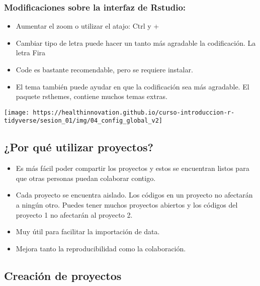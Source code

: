 \documentclass[
]{book}
\begin{document}
\hypertarget{modificaciones-sobre-la-interfaz-de-rstudio}{%
\subsubsection{\texorpdfstring{\textbf{Modificaciones sobre la interfaz de Rstudio:}}{Modificaciones sobre la interfaz de Rstudio:}}\label{modificaciones-sobre-la-interfaz-de-rstudio}}

\begin{itemize}
\item
  Aumentar el zoom o utilizar el atajo: Ctrl y +
\item
  Cambiar tipo de letra puede hacer un tanto más agradable la codificación. La letra Fira
\item
  Code es bastante recomendable, pero se requiere instalar.
\item
  El tema también puede ayudar en que la codificación sea más agradable. El paquete rsthemes, contiene muchos temas extras.
\end{itemize}

\begin{center}\texttt{[image: https://healthinnovation.github.io/curso-introduccion-r-tidyverse/sesion\_01/img/04\_config\_global\_v2]} \end{center}

\hypertarget{por-quuxe9-utilizar-proyectos}{%
\subsection{¿Por qué utilizar proyectos?}\label{por-quuxe9-utilizar-proyectos}}

\begin{itemize}
\item
  Es más fácil poder compartir los proyectos y estos se encuentran listos para que otras personas puedan colaborar contigo.
\item
  Cada proyecto se encuentra aislado. Los códigos en un proyecto no afectarán a ningún otro. Puedes tener muchos proyectos abiertos y los códigos del proyecto 1 no afectarán al proyecto 2.
\item
  Muy útil para facilitar la importación de data.
\item
  Mejora tanto la reproducibilidad como la colaboración.
\end{itemize}

\hypertarget{creaciuxf3n-de-proyectos}{%
\subsection{Creación de proyectos}\label{creaciuxf3n-de-proyectos}}
\end{document}
